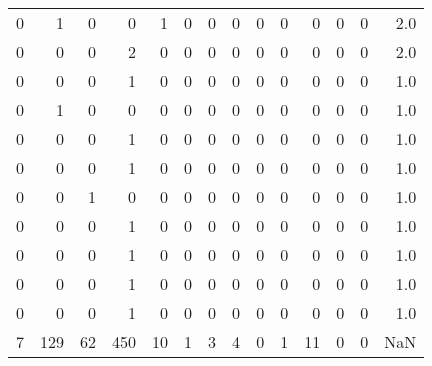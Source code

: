 \begin{tabular}{rrrrrrrrrrrrrr}
       0 &       1 &          0 &               0 &                1 &       0 &          0 &          0 &         0 &         0 &      0 &             0 &         0 &      2.0 \\
       0 &       0 &          0 &               2 &                0 &       0 &          0 &          0 &         0 &         0 &      0 &             0 &         0 &      2.0 \\
       0 &       0 &          0 &               1 &                0 &       0 &          0 &          0 &         0 &         0 &      0 &             0 &         0 &      1.0 \\
       0 &       1 &          0 &               0 &                0 &       0 &          0 &          0 &         0 &         0 &      0 &             0 &         0 &      1.0 \\
       0 &       0 &          0 &               1 &                0 &       0 &          0 &          0 &         0 &         0 &      0 &             0 &         0 &      1.0 \\
       0 &       0 &          0 &               1 &                0 &       0 &          0 &          0 &         0 &         0 &      0 &             0 &         0 &      1.0 \\
       0 &       0 &          1 &               0 &                0 &       0 &          0 &          0 &         0 &         0 &      0 &             0 &         0 &      1.0 \\
       0 &       0 &          0 &               1 &                0 &       0 &          0 &          0 &         0 &         0 &      0 &             0 &         0 &      1.0 \\
       0 &       0 &          0 &               1 &                0 &       0 &          0 &          0 &         0 &         0 &      0 &             0 &         0 &      1.0 \\
       0 &       0 &          0 &               1 &                0 &       0 &          0 &          0 &         0 &         0 &      0 &             0 &         0 &      1.0 \\
       0 &       0 &          0 &               1 &                0 &       0 &          0 &          0 &         0 &         0 &      0 &             0 &         0 &      1.0 \\
       7 &     129 &         62 &             450 &               10 &       1 &          3 &          4 &         0 &         1 &     11 &             0 &         0 &      NaN \\
\bottomrule
\end{tabular}
